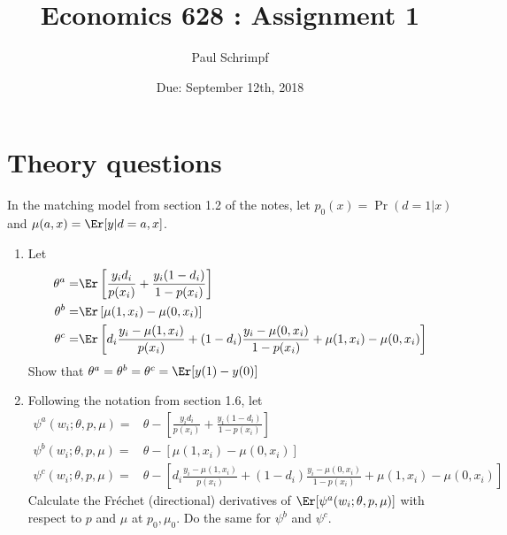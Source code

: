 

\title{Economics 628 : Assignment 1}
\author{Paul Schrimpf}
\date{Due: September 12th, 2018}


\maketitle

\section{Theory questions}

\begin{problem}
  In the matching model from section 1.2 of the notes, let $p_0(x) =
  \Pr(d=1|x)$ and $\mu(a,x) = \Er[y|d=a,x]$. 
  \begin{enumerate}
  \item Let
    \begin{align*}
      \theta^a = & \Er\left[\frac{y_i d_i}{p(x_i)} + \frac{y_i
               (1-d_i)}{1-p(x_i)} \right] \\
      \theta^b = & \Er\left[\mu(1,x_i) - \mu(0,x_i)\right] \\
      \theta^c = & \Er\left[d_i \frac{y_i -\mu(1,x_i)}{p(x_i)} +
                   (1-d_i)\frac{y_i - \mu(0,x_i)}{1-p(x_i)} +
                   \mu(1,x_i) - \mu(0,x_i)\right]
    \end{align*}
    Show that $\theta^a = \theta^b = \theta^c = \Er[y(1) - y(0)]$
  \item Following the notation from section 1.6, let
    \begin{align*}
      \psi^a(w_i;\theta,p,\mu) = & \theta - \left[\frac{y_i d_i}{p(x_i)} + \frac{y_i
                                   (1-d_i)}{1-p(x_i)} \right] \\
      \psi^b(w_i;\theta,p,\mu) = & \theta - \left[\mu(1,x_i) - \mu(0,x_i)\right] \\
      \psi^c(w_i;\theta,p,\mu) = & \theta - \left[d_i \frac{y_i -\mu(1,x_i)}{p(x_i)} +
                                   (1-d_i)\frac{y_i - \mu(0,x_i)}{1-p(x_i)} +
                                   \mu(1,x_i) - \mu(0,x_i)\right]
    \end{align*}                                   
    Calculate the Fr\'{e}chet (directional) derivatives of
    $\Er[\psi^a(w_i;\theta,p,\mu)]$ with respect to $p$ and $\mu$ at
    $p_0, \mu_0$. Do the same for $\psi^b$ and $\psi^c$.    
  \end{enumerate}
\end{problem}


